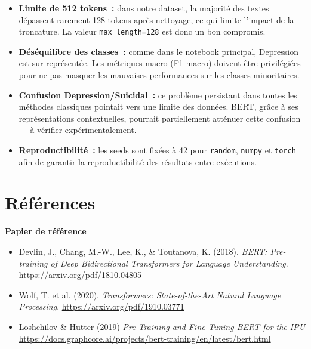 \documentclass[12pt,a4paper]{article}
\begin{document}
\begin{itemize}[leftmargin=1.5cm]
  \item \textbf{Limite de 512 tokens~:} dans notre dataset, la majorité des textes
    dépassent rarement 128 tokens après nettoyage, ce qui limite l'impact de la
    troncature. La valeur \texttt{max\_length=128} est donc un bon compromis.
  \item \textbf{Déséquilibre des classes~:} comme dans le notebook principal, Depression
    est sur-représentée. Les métriques macro (F1 macro) doivent être privilégiées pour
    ne pas masquer les mauvaises performances sur les classes minoritaires.
  \item \textbf{Confusion Depression/Suicidal~:} ce problème persistant dans toutes les
    méthodes classiques pointait vers une limite des données. BERT, grâce à ses
    représentations contextuelles, pourrait partiellement atténuer cette confusion — à
    vérifier expérimentalement.
  \item \textbf{Reproductibilité~:} les seeds sont fixées à 42 pour \texttt{random},
    \texttt{numpy} et \texttt{torch} afin de garantir la reproductibilité des
    résultats entre exécutions.
\end{itemize}

\pagebreak
\section*{Références}

\textbf{Papier de référence}
\begin{itemize}[leftmargin=1.5cm]
  \item Devlin, J., Chang, M.-W., Lee, K., \& Toutanova, K. (2018).
    \textit{BERT: Pre-training of Deep Bidirectional Transformers for Language
    Understanding}. \url{https://arxiv.org/pdf/1810.04805}
  \item Wolf, T. et al. (2020). \textit{Transformers: State-of-the-Art Natural Language
    Processing}. \url{https://arxiv.org/pdf/1910.03771}
  \item Loshchilov \& Hutter (2019)
    \textit{Pre-Training and Fine-Tuning BERT for the IPU}
    \url{https://docs.graphcore.ai/projects/bert-training/en/latest/bert.html}
\end{itemize}
\end{document}
